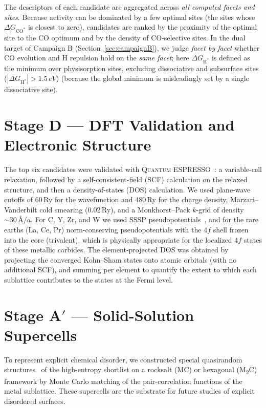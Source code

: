 \documentclass[11pt,a4paper]{report}
\providecommand{\SI}[2]{#1\,#2}
\providecommand{\angstrom}{\mbox{\AA}}
\newcommand{\dGCO}{\Delta G_{\mathrm{CO^*}}}
\newcommand{\dGH}{\Delta G_{\mathrm{H^*}}}
\begin{document}
\noindent The descriptors of each candidate are aggregated across \emph{all computed facets and sites}. Because activity can be dominated by a few optimal
sites (the sites whose $\dGCO$ is closest to zero), candidates are ranked by the proximity of the optimal site to the CO optimum and by the density of
CO-selective sites. In the dual target of Campaign B (Section~\ref{sec:campaignB}), we judge \emph{facet by facet} whether CO evolution and H
repulsion hold on the \emph{same facet}; here $\dGH$ is defined as the minimum over physisorption sites, excluding dissociative and subsurface
sites ($|\dGH|>\SI{1.5}{eV}$) (because the global minimum is misleadingly set by a single dissociative
site).

\section{Stage D --- DFT Validation and Electronic Structure}
The top six candidates were validated with \textsc{Quantum ESPRESSO}~\cite{giannozzi2009}: a variable-cell relaxation, followed by a self-consistent-field (SCF) calculation
on the relaxed structure, and then a density-of-states (DOS) calculation. We used plane-wave cutoffs of \SI{60}{Ry} for the wavefunction and
\SI{480}{Ry} for the charge density, Marzari--Vanderbilt cold smearing (\SI{0.02}{Ry}), and a Monkhorst--Pack $k$-grid of density
$\sim\!\SI{30}{\angstrom}/a$. For C, Y, Zr, and W we used SSSP
pseudopotentials~\cite{prandini2018}, and for the rare earths (La, Ce, Pr) norm-conserving pseudopotentials with the $4f$ shell frozen into the core (trivalent),
which is physically appropriate for the localized $4f$ states of these metallic carbides.
The element-projected DOS was obtained by projecting the converged Kohn--Sham states onto atomic orbitals (with no additional SCF), and
summing per element to quantify the extent to which each sublattice contributes to the states at the Fermi level.

\section{Stage A$'$ --- Solid-Solution Supercells}
To represent explicit chemical disorder, we constructed special quasirandom structures~\cite{zunger1990} of the high-entropy
shortlist on a rocksalt (MC) or hexagonal (M\textsubscript{2}C) framework by Monte Carlo matching of the pair-correlation functions of the metal
sublattice. These supercells are the substrate for future studies of explicit disordered surfaces.
\end{document}
